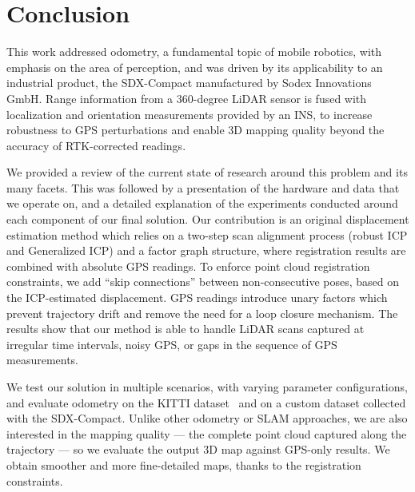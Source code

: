 \chapter{Conclusion}
\label{ch:conclusion}

This work addressed odometry, a fundamental topic of mobile robotics, with emphasis on the area of perception, and was driven by its applicability to an industrial product, the SDX-Compact manufactured by Sodex Innovations GmbH. Range information from a 360-degree LiDAR sensor is fused with localization and orientation measurements provided by an INS, to increase robustness to GPS perturbations and enable 3D mapping quality beyond the accuracy of RTK-corrected readings.

We provided a review of the current state of research around this problem and its many facets. This was followed by a presentation of the hardware and data that we operate on, and a detailed explanation of the experiments conducted around each component of our final solution. Our contribution is an original displacement estimation method which relies on a two-step scan alignment process (robust ICP and Generalized ICP) and a factor graph structure, where registration results are combined with absolute GPS readings. To enforce point cloud registration constraints, we add ``skip connections'' between non-consecutive poses, based on the ICP-estimated displacement. GPS readings introduce unary factors which prevent trajectory drift and remove the need for a loop closure mechanism. The results show that our method is able to handle LiDAR scans captured at irregular time intervals, noisy GPS, or gaps in the sequence of GPS measurements.

We test our solution in multiple scenarios, with varying parameter configurations, and evaluate odometry on the KITTI dataset~\cite{geiger2013vision} and on a custom dataset collected with the SDX-Compact. Unlike other odometry or SLAM approaches, we are also interested in the mapping quality --- the complete point cloud captured along the trajectory --- so we evaluate the output 3D map against GPS-only results. We obtain smoother and more fine-detailed maps, thanks to the registration constraints.


